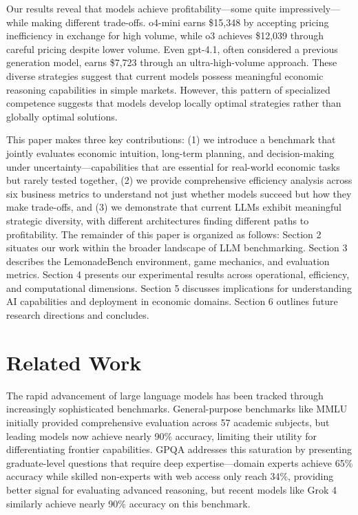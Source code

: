 \documentclass[11pt]{article}
\begin{document}
Our results reveal that models achieve profitability—some quite impressively—while making different trade-offs. o4-mini earns \$15,348 by accepting pricing inefficiency in exchange for high volume, while o3 achieves \$12,039 through careful pricing despite lower volume. Even gpt-4.1, often considered a previous generation model, earns \$7,723 through an ultra-high-volume approach. These diverse strategies suggest that current models possess meaningful economic reasoning capabilities in simple markets. However, this pattern of specialized competence suggests that models develop locally optimal strategies rather than globally optimal solutions.

This paper makes three key contributions: (1) we introduce a benchmark that jointly evaluates economic intuition, long-term planning, and decision-making under uncertainty—capabilities that are essential for real-world economic tasks but rarely tested together, (2) we provide comprehensive efficiency analysis across six business metrics to understand not just whether models succeed but how they make trade-offs, and (3) we demonstrate that current LLMs exhibit meaningful strategic diversity, with different architectures finding different paths to profitability. The remainder of this paper is organized as follows: Section 2 situates our work within the broader landscape of LLM benchmarking. Section 3 describes the LemonadeBench environment, game mechanics, and evaluation metrics. Section 4 presents our experimental results across operational, efficiency, and computational dimensions. Section 5 discusses implications for understanding AI capabilities and deployment in economic domains. Section 6 outlines future research directions and concludes.

\section{Related Work}

The rapid advancement of large language models has been tracked through increasingly sophisticated benchmarks.
General-purpose benchmarks like MMLU \cite{hendrycks2021measuringmassivemultitasklanguage} initially provided comprehensive evaluation across 57 academic subjects, but leading models now achieve nearly 90\% accuracy, limiting their utility for differentiating frontier capabilities.
GPQA \cite{rein2023gpqagraduatelevelgoogleproofqa} addresses this saturation by presenting graduate-level questions that require deep expertise—domain experts achieve 65\% accuracy while skilled non-experts with web access only reach 34\%, providing better signal for evaluating advanced reasoning, but recent models like Grok 4 \cite{grok4_xai_2025} similarly achieve nearly 90\% accuracy on this benchmark.
\end{document}
